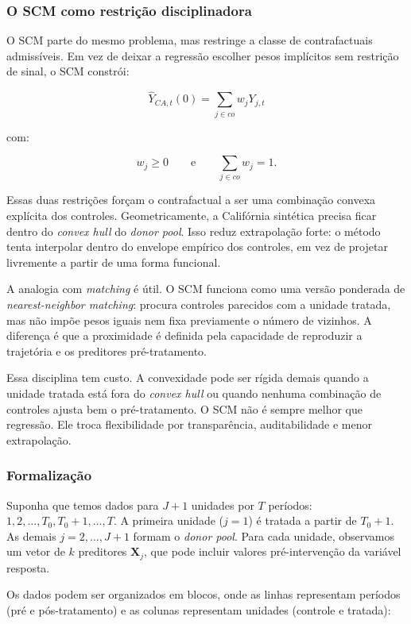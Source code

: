 \documentclass[
]{article}
\begin{document}
\subsubsection{O SCM como restrição disciplinadora}\label{o-scm-como-restriuxe7uxe3o-disciplinadora}

O SCM parte do mesmo problema, mas restringe a classe de contrafactuais admissíveis. Em vez de deixar a regressão escolher pesos implícitos sem restrição de sinal, o SCM constrói:

\[
\hat{Y}_{CA,t}(0) = \sum_{j \in co} w_jY_{j,t}
\]

com:

\[
w_j \geq 0
\qquad \text{e} \qquad
\sum_{j \in co} w_j = 1.
\]

Essas duas restrições forçam o contrafactual a ser uma combinação convexa explícita dos controles. Geometricamente, a Califórnia sintética precisa ficar dentro do \emph{convex hull} do \emph{donor pool}. Isso reduz extrapolação forte: o método tenta interpolar dentro do envelope empírico dos controles, em vez de projetar livremente a partir de uma forma funcional.

A analogia com \emph{matching} é útil. O SCM funciona como uma versão ponderada de \emph{nearest-neighbor matching}: procura controles parecidos com a unidade tratada, mas não impõe pesos iguais nem fixa previamente o número de vizinhos. A diferença é que a proximidade é definida pela capacidade de reproduzir a trajetória e os preditores pré-tratamento.

Essa disciplina tem custo. A convexidade pode ser rígida demais quando a unidade tratada está fora do \emph{convex hull} ou quando nenhuma combinação de controles ajusta bem o pré-tratamento. O SCM não é sempre melhor que regressão. Ele troca flexibilidade por transparência, auditabilidade e menor extrapolação.

\subsubsection{Formalização}\label{formalizauxe7uxe3o}

Suponha que temos dados para \(J+1\) unidades por \(T\) períodos: \(1, 2, \ldots, T_0, T_0+1, \ldots, T\). A primeira unidade (\(j=1\)) é tratada a partir de \(T_0+1\). As demais \(j = 2, \ldots, J+1\) formam o \emph{donor pool}. Para cada unidade, observamos um vetor de \(k\) preditores \(\mathbf{X}_j\), que pode incluir valores pré-intervenção da variável resposta.

Os dados podem ser organizados em blocos, onde as linhas representam períodos (pré e pós-tratamento) e as colunas representam unidades (controle e tratada):
\end{document}
